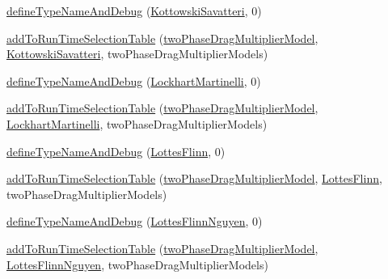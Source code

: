 \begin{DoxyCompactItemize}
\item 
\hyperlink{namespaceFoam_1_1twoPhaseDragMultiplierModels_aa98f8449cfc1b1dd9f74d6ee2013ae0b}{define\+Type\+Name\+And\+Debug} (\hyperlink{classFoam_1_1twoPhaseDragMultiplierModels_1_1KottowskiSavatteri}{Kottowski\+Savatteri}, 0)
\item 
\hyperlink{namespaceFoam_1_1twoPhaseDragMultiplierModels_a71ef6ee96da715ad0f2101fecfd004f3}{add\+To\+Run\+Time\+Selection\+Table} (\hyperlink{classFoam_1_1twoPhaseDragMultiplierModel}{two\+Phase\+Drag\+Multiplier\+Model}, \hyperlink{classFoam_1_1twoPhaseDragMultiplierModels_1_1KottowskiSavatteri}{Kottowski\+Savatteri}, two\+Phase\+Drag\+Multiplier\+Models)
\item 
\hyperlink{namespaceFoam_1_1twoPhaseDragMultiplierModels_a4bce5740539fde32e2259c6072a24ac9}{define\+Type\+Name\+And\+Debug} (\hyperlink{classFoam_1_1twoPhaseDragMultiplierModels_1_1LockhartMartinelli}{Lockhart\+Martinelli}, 0)
\item 
\hyperlink{namespaceFoam_1_1twoPhaseDragMultiplierModels_a325b456f4eb509da8c8e99cac87f1b14}{add\+To\+Run\+Time\+Selection\+Table} (\hyperlink{classFoam_1_1twoPhaseDragMultiplierModel}{two\+Phase\+Drag\+Multiplier\+Model}, \hyperlink{classFoam_1_1twoPhaseDragMultiplierModels_1_1LockhartMartinelli}{Lockhart\+Martinelli}, two\+Phase\+Drag\+Multiplier\+Models)
\item 
\hyperlink{namespaceFoam_1_1twoPhaseDragMultiplierModels_acce9a22cd51cafda5cadaea6da9b44a7}{define\+Type\+Name\+And\+Debug} (\hyperlink{classFoam_1_1twoPhaseDragMultiplierModels_1_1LottesFlinn}{Lottes\+Flinn}, 0)
\item 
\hyperlink{namespaceFoam_1_1twoPhaseDragMultiplierModels_aa54edf9e0505fe5e8ee3c7f44fdc9088}{add\+To\+Run\+Time\+Selection\+Table} (\hyperlink{classFoam_1_1twoPhaseDragMultiplierModel}{two\+Phase\+Drag\+Multiplier\+Model}, \hyperlink{classFoam_1_1twoPhaseDragMultiplierModels_1_1LottesFlinn}{Lottes\+Flinn}, two\+Phase\+Drag\+Multiplier\+Models)
\item 
\hyperlink{namespaceFoam_1_1twoPhaseDragMultiplierModels_a0a6de1945765104d9bb048b5e335d5c0}{define\+Type\+Name\+And\+Debug} (\hyperlink{classFoam_1_1twoPhaseDragMultiplierModels_1_1LottesFlinnNguyen}{Lottes\+Flinn\+Nguyen}, 0)
\item 
\hyperlink{namespaceFoam_1_1twoPhaseDragMultiplierModels_a68be1684a0c8eb693b91f37fd1077aee}{add\+To\+Run\+Time\+Selection\+Table} (\hyperlink{classFoam_1_1twoPhaseDragMultiplierModel}{two\+Phase\+Drag\+Multiplier\+Model}, \hyperlink{classFoam_1_1twoPhaseDragMultiplierModels_1_1LottesFlinnNguyen}{Lottes\+Flinn\+Nguyen}, two\+Phase\+Drag\+Multiplier\+Models)
\end{DoxyCompactItemize}


